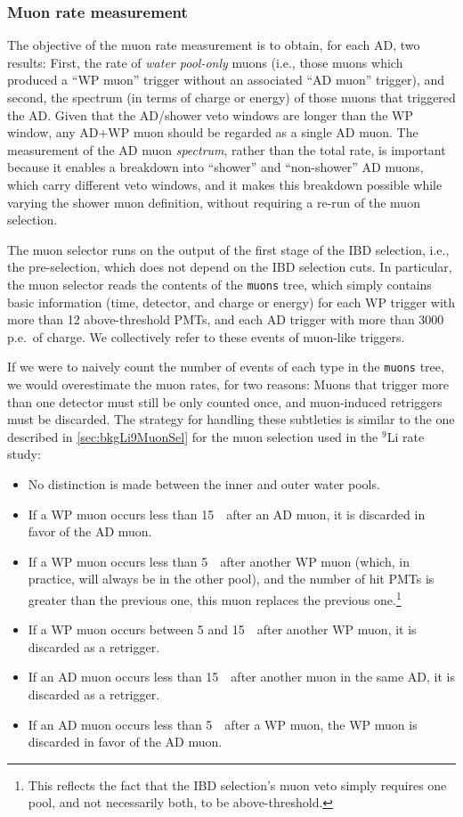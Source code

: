 \documentclass[../thesis.tex]{subfiles}
\begin{document}
\subsubsection{Muon rate measurement}%
\label{sec:cutVaryMuRate}

The objective of the muon rate measurement is to obtain, for each AD, two results: First, the rate of \emph{water pool-only} muons (i.e., those muons which produced a ``WP muon'' trigger without an associated ``AD muon'' trigger), and second, the spectrum (in terms of charge or energy) of those muons that triggered the AD\@. Given that the AD/shower veto windows are longer than the WP window, any AD+WP muon should be regarded as a single AD muon. The measurement of the AD muon \emph{spectrum}, rather than the total rate, is important because it enables a breakdown into ``shower'' and ``non-shower'' AD muons, which carry different veto windows, and it makes this breakdown possible while varying the shower muon definition, without requiring a re-run of the muon selection.

The muon selector runs on the output of the first stage of the IBD selection, i.e., the pre-selection, which does not depend on the IBD selection cuts. In particular, the muon selector reads the contents of the \texttt{muons} tree, which simply contains basic information (time, detector, and charge or energy) for each WP trigger with more than 12 above-threshold PMTs, and each AD trigger with more than 3000 p.e.\ of charge. We collectively refer to these events of muon-like triggers.

If we were to naively count the number of events of each type in the \texttt{muons} tree, we would overestimate the muon rates, for two reasons: Muons that trigger more than one detector must still be only counted once, and muon-induced retriggers must be discarded. The strategy for handling these subtleties is similar to the one described in \autoref{sec:bkgLi9MuonSel} for the muon selection used in the $^9$Li rate study:

\begin{itemize}
\item No distinction is made between the inner and outer water pools.
\item If a WP muon occurs less than 15~\us\ after an AD muon, it is discarded in favor of the AD muon.
\item If a WP muon occurs less than 5~\us\ after another WP muon (which, in practice, will always be in the other pool), and the number of hit PMTs is greater than the previous one, this muon replaces the previous one.\footnote{This reflects the fact that the IBD selection's muon veto simply requires one pool, and not necessarily both, to be above-threshold.}
\item If a WP muon occurs between 5 and 15~\us\ after another WP muon, it is discarded as a retrigger.
\item If an AD muon occurs less than 15~\us\ after another muon in the same AD, it is discarded as a retrigger.
\item If an AD muon occurs less than 5~\us\ after a WP muon, the WP muon is discarded in favor of the AD muon.
\end{itemize}
\end{document}
